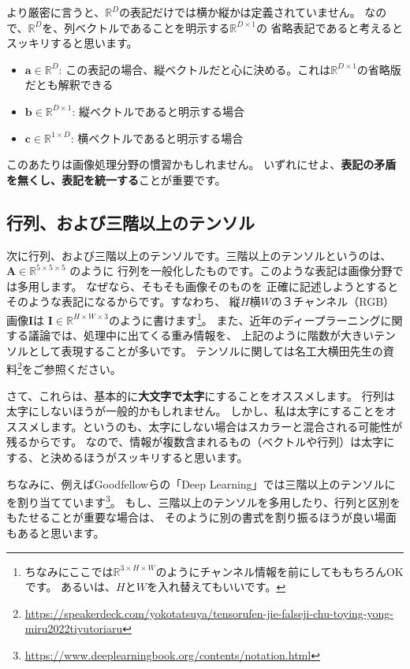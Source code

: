 \documentclass[uplatex,twocolumn,9pt,dvipdfmx]{jsarticle}
\begin{document}
より厳密に言うと、$\mathbb{R}^D$の表記だけでは横か縦かは定義されていません。
なので、$\mathbb{R}^D$を、列ベクトルであることを明示する$\mathbb{R}^{D \times 1}$の
省略表記であると考えるとスッキリすると思います。
\begin{itemize}
    \item $\mathbf{a} \in \mathbb{R}^D$: この表記の場合、縦ベクトルだと心に決める。これは$\mathbb{R}^{D \times 1}$の省略版だとも解釈できる
    \item $\mathbf{b} \in \mathbb{R}^{D \times 1}$: 縦ベクトルであると明示する場合
    \item $\mathbf{c} \in \mathbb{R}^{1 \times D}$: 横ベクトルであると明示する場合
\end{itemize}
このあたりは画像処理分野の慣習かもしれません。
いずれにせよ、\textbf{表記の矛盾を無くし、表記を統一する}ことが重要です。


\subsection{行列、および三階以上のテンソル}
次に行列、および三階以上のテンソルです。三階以上のテンソルというのは、
$\mathbf{A} \in \mathbb{R}^{5\times 5 \times 5}$ のように
行列を一般化したものです。このような表記は画像分野では多用します。
なぜなら、そもそも画像そのものを
正確に記述しようとするとそのような表記になるからです。すなわち、
縦$H$横$W$の３チャンネル（RGB）画像$\mathbf{I}$は
$\mathbf{I} \in \mathbb{R}^{H \times W \times 3}$のように書けます\footnote{
ちなみにここでは$\mathbb{R}^{3 \times H \times W}$のようにチャンネル情報を前にしてももちろんOKです。
あるいは、$H$と$W$を入れ替えてもいいです。}。
また、近年のディープラーニングに関する議論では、処理中に出てくる重み情報を、
上記のように階数が大きいテンソルとして表現することが多いです。
テンソルに関しては名工大横田先生の資料\footnote{\url{https://speakerdeck.com/yokotatsuya/tensorufen-jie-falseji-chu-toying-yong-miru2022tiyutoriaru}}をご参照ください。

さて、これらは、基本的に\textbf{大文字で太字}にすることをオススメします。
行列は太字にしないほうが一般的かもしれません。
しかし、私は太字にすることをオススメします。というのも、太字にしない場合はスカラーと混合される可能性が残るからです。
なので、情報が複数含まれるもの（ベクトルや行列）は太字にする、と決めるほうがスッキリすると思います。

ちなみに、例えばGoodfellowらの「Deep Learning」では三階以上のテンソルに
\texttt{\mathsf}を割り当てています\footnote{\url{https://www.deeplearningbook.org/contents/notation.html}}。
もし、三階以上のテンソルを多用したり、行列と区別をもたせることが重要な場合は、
そのように別の書式を割り振るほうが良い場面もあると思います。
\end{document}
